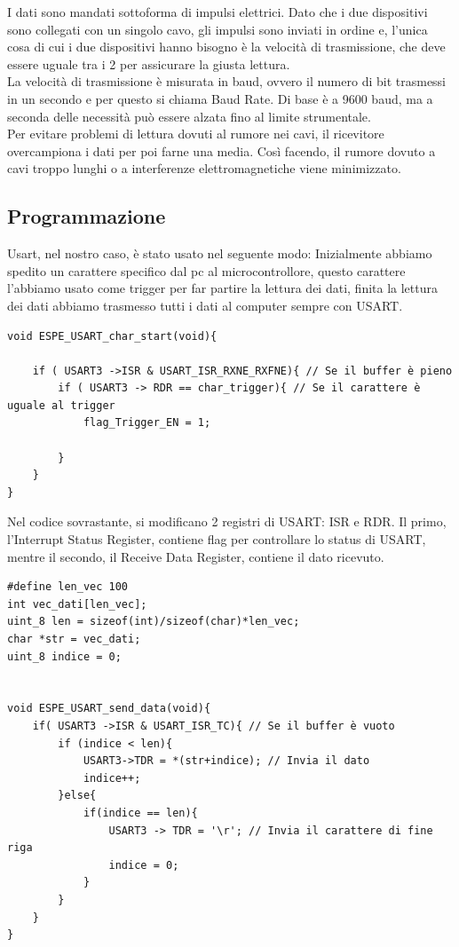 I dati sono mandati sottoforma di impulsi elettrici. Dato che i due dispositivi sono collegati con un singolo cavo, gli impulsi sono inviati in ordine e, l'unica cosa di cui i due dispositivi hanno bisogno è la velocità di trasmissione, che deve essere uguale tra i 2 per assicurare la giusta lettura.\\
La velocità di trasmissione è misurata in baud, ovvero il numero di bit trasmessi in un secondo e per questo si chiama Baud Rate. Di base è a 9600 baud, ma a seconda delle necessità può essere alzata fino al limite strumentale.\\

Per evitare problemi di lettura dovuti al rumore nei cavi, il ricevitore overcampiona i dati per poi farne una media. Così facendo, il rumore dovuto a cavi troppo lunghi o a interferenze elettromagnetiche viene minimizzato.\\


\subsection{Programmazione}
Usart, nel nostro caso, è stato usato nel seguente modo: Inizialmente abbiamo spedito un carattere specifico dal pc al microcontrollore, questo carattere l'abbiamo usato come trigger per far partire la lettura dei dati, finita la lettura dei dati abbiamo trasmesso tutti i dati al computer sempre con USART.\\

\noindent
\begin{verbatim}
void ESPE_USART_char_start(void){

    if ( USART3 ->ISR & USART_ISR_RXNE_RXFNE){ // Se il buffer è pieno
        if ( USART3 -> RDR == char_trigger){ // Se il carattere è uguale al trigger
            flag_Trigger_EN = 1;

        }
    }
}
\end{verbatim}
\label{code:USART_start}

Nel codice sovrastante, si modificano 2 registri di USART: ISR e RDR. Il primo, l'Interrupt Status Register, contiene flag per controllare lo status di USART, mentre il secondo, il Receive Data Register, contiene il dato ricevuto.\\

\noindent
\begin{verbatim}
#define len_vec 100
int vec_dati[len_vec];
uint_8 len = sizeof(int)/sizeof(char)*len_vec;
char *str = vec_dati;
uint_8 indice = 0;


void ESPE_USART_send_data(void){
    if( USART3 ->ISR & USART_ISR_TC){ // Se il buffer è vuoto
		if (indice < len){
			USART3->TDR = *(str+indice); // Invia il dato
			indice++;
		}else{
			if(indice == len){
				USART3 -> TDR = '\r'; // Invia il carattere di fine riga
				indice = 0;
			}
		}
	}
}
\end{verbatim}
\label{code:USART_send}

